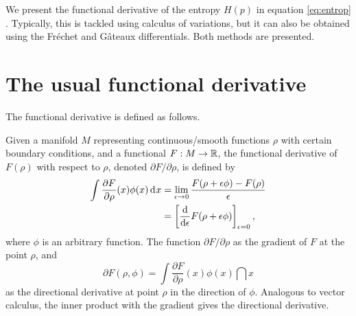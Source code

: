 We present the functional derivative of the entropy $H(p)$ in equation \ref{eq:entrop} .
Typically, this is tackled using calculus of variations, but it can also be obtained using the Fréchet and Gâteaux differentials.
Both methods are presented.

\section{The usual functional derivative}


The functional derivative is defined as follows.

\begin{definition}
  Given a manifold $M$ representing continuous/smooth functions $\rho$ with certain boundary conditions, and a functional $F:M\to\mathbb{R}$, the functional derivative of $F(\rho)$ with respect to $\rho$, denoted $\partial F/\partial\rho$, is defined by
  \begin{align*}
    \int \frac{\partial F}{\partial\rho}(x)\phi(x) \operatorname{d}\hspace{0.5pt}\! x
    &= \lim_{\epsilon\to 0} \frac{F(\rho + \epsilon\phi) - F(\rho)}{\epsilon} \\
    &= \left[ \frac{\text{d}}{\text{d} \epsilon} F(\rho + \epsilon\phi) \right]_{\epsilon=0},
  \end{align*}
  where $\phi$ is an arbitrary function.
  The function $\partial F/\partial\rho$ as the gradient of $F$ at the point $\rho$, and
  \[
    \partial F(\rho,\phi) = \int \frac{\partial F}{\partial\rho}(x)\phi(x) \dint x
  \]
  as the directional derivative at point $\rho$ in the direction of $\phi$.
  Analogous to vector calculus, the inner product with the gradient gives the directional derivative.
\end{definition}

